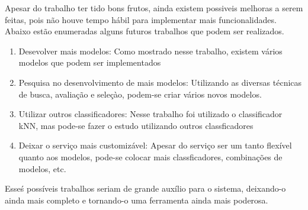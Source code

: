 Apesar do trabalho ter tido bons frutos, ainda existem possiveis melhoras a serem feitas, pois não houve tempo hábil para implementar mais funcionalidades. Abaixo estão enumeradas alguns futuros trabalhos que podem ser realizados.

\begin{enumerate}
	\item{Desevolver mais modelos: Como mostrado nesse trabalho, existem vários modelos que podem ser implementados}
	\item{Pesquisa no desenvolvimento de mais modelos: Utilizando as diversas técnicas de busca, avaliação e seleçào, podem-se criar vários novos modelos.}
	\item{Utilizar outros classificadores: Nesse trabalho foi utilizado o classificador kNN, mas pode-se fazer o estudo utilizando outros classficadores}
	\item{Deixar o serviço mais customizável: Apesar do serviço ser um tanto flexível quanto aos modelos, pode-se colocar mais classficadores, combinações de modelos, etc.}
\end{enumerate}

Esseś possíveis trabalhos seriam de grande auxílio para o sistema, deixando-o ainda mais completo e tornando-o uma ferramenta ainda mais poderosa.